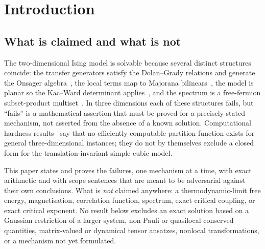 \documentclass[11pt]{article}
\theoremstyle{definition}
\begin{document}
\tableofcontents

\section{Introduction}

\subsection{What is claimed and what is not}
The two-dimensional Ising model is solvable because several distinct structures coincide: the
transfer generators satisfy the Dolan--Grady relations and generate the Onsager
algebra~\cite{dolangrady1982,davies1990_onsager,davies1991_onsager}, the local terms map to Majorana
bilinears~\cite{schultzmattisl1964}, the model is planar so the Kac--Ward determinant
applies~\cite{kacward1952}, and the spectrum is a free-fermion subset-product
multiset~\cite{onsager1944,kaufman1949}. In three dimensions each of these structures fails, but
``fails'' is a mathematical assertion that must be proved for a precisely stated mechanism, not
asserted from the absence of a known solution. Computational hardness results~\cite{istrail2000} say
that no efficiently computable partition function exists for general three-dimensional instances;
they do not by themselves exclude a closed form for the translation-invariant simple-cubic model.

This paper states and proves the failures, one mechanism at a time, with exact arithmetic and with
scope sentences that are meant to be adversarial against their own conclusions. What is
\emph{not} claimed anywhere: a thermodynamic-limit free energy, magnetisation, correlation function,
spectrum, exact critical coupling, or exact critical exponent. No result below excludes an exact
solution based on a Gaussian restriction of a larger system, non-Pauli or quasilocal conserved
quantities, matrix-valued or dynamical tensor ansatzes, nonlocal transformations, or a mechanism not
yet formulated.
\end{document}
